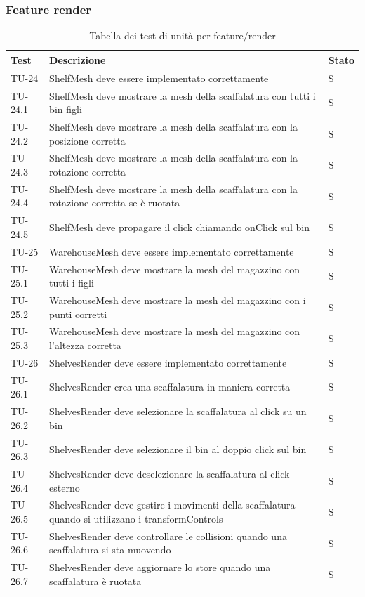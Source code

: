 \subsubsection{Feature render}
\renewcommand{\arraystretch}{1.5}
\begin{xltabular}{0.9\textwidth}{X | p{0.6\textwidth} | p{0.1\textwidth} }
    \textbf{\color{white} Test} & \textbf{\color{white} Descrizione} & \textbf{\color{white} Stato}\\ 
    \hline
    \endhead
    \caption{Tabella dei test di unità per feature/render} 
    \label{tab:test_sistema}
    \endlastfoot

    TU-24 & ShelfMesh deve essere implementato correttamente & S\\
    TU-24.1 & ShelfMesh deve mostrare la mesh della scaffalatura con tutti i bin figli & S\\
    TU-24.2 & ShelfMesh deve mostrare la mesh della scaffalatura con la posizione corretta & S\\
    TU-24.3 & ShelfMesh deve mostrare la mesh della scaffalatura con la rotazione corretta & S\\
    TU-24.4 & ShelfMesh deve mostrare la mesh della scaffalatura con la rotazione corretta se è ruotata & S\\
    TU-24.5 & ShelfMesh deve propagare il click chiamando onClick sul bin & S\\
    
    TU-25 & WarehouseMesh deve essere implementato correttamente & S\\
    TU-25.1 & WarehouseMesh deve mostrare la mesh del magazzino con tutti i figli & S\\
    TU-25.2 & WarehouseMesh deve mostrare la mesh del magazzino con i punti corretti & S\\
    TU-25.3 & WarehouseMesh deve mostrare la mesh del magazzino con l'altezza corretta & S\\
    
    TU-26 & ShelvesRender deve essere implementato correttamente & S\\
    TU-26.1 & ShelvesRender crea una scaffalatura in maniera corretta & S\\
    TU-26.2 & ShelvesRender deve selezionare la scaffalatura al click su un bin & S\\
    TU-26.3 & ShelvesRender deve selezionare il bin al doppio click sul bin & S\\
    TU-26.4 & ShelvesRender deve deselezionare la scaffalatura al click esterno & S\\
    TU-26.5 & ShelvesRender deve gestire i movimenti della scaffalatura quando si utilizzano i transformControls & S\\
    TU-26.6 & ShelvesRender deve controllare le collisioni quando una scaffalatura si sta muovendo & S\\
    TU-26.7 & ShelvesRender deve aggiornare lo store quando una scaffalatura è ruotata & S\\
    

\end{xltabular}
